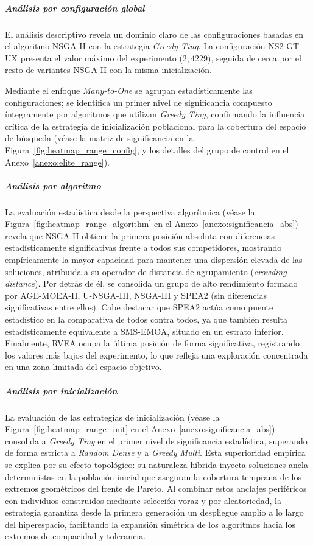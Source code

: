 \subparagraph{Análisis por configuración global}

El análisis descriptivo revela un dominio claro de las configuraciones basadas en el algoritmo NSGA-II con la estrategia \textit{Greedy Ting}. La configuración NS2-GT-UX presenta el valor máximo del experimento ($2{,}4229$), seguida de cerca por el resto de variantes NSGA-II con la misma inicialización. 

Mediante el enfoque \textit{Many-to-One} se agrupan estadísticamente las configuraciones; se identifica un primer nivel de significancia compuesto íntegramente por algoritmos que utilizan \textit{Greedy Ting}, confirmando la influencia crítica de la estrategia de inicialización poblacional para la cobertura del espacio de búsqueda (véase la matriz de significancia en la Figura~\ref{fig:heatmap_range_config}, y los detalles del grupo de control en el Anexo~\ref{anexo:elite_range}).

\subparagraph{Análisis por algoritmo}

La evaluación estadística desde la perspectiva algorítmica (véase la Figura~\ref{fig:heatmap_range_algorithm} en el Anexo~\ref{anexo:significancia_abs}) revela que NSGA-II obtiene la primera posición absoluta con diferencias estadísticamente significativas frente a todos sus competidores, mostrando empíricamente la mayor capacidad para mantener una dispersión elevada de las soluciones, atribuida a su operador de distancia de agrupamiento (\textit{crowding distance}). Por detrás de él, se consolida un grupo de alto rendimiento formado por AGE-MOEA-II, U-NSGA-III, NSGA-III y SPEA2 (sin diferencias significativas entre ellos). Cabe destacar que SPEA2 actúa como puente estadístico en la comparativa de todos contra todos, ya que también resulta estadísticamente equivalente a SMS-EMOA, situado en un estrato inferior. Finalmente, RVEA ocupa la última posición de forma significativa, registrando los valores más bajos del experimento, lo que refleja una exploración concentrada en una zona limitada del espacio objetivo.

\subparagraph{Análisis por inicialización}

La evaluación de las estrategias de inicialización (véase la Figura~\ref{fig:heatmap_range_init} en el Anexo~\ref{anexo:significancia_abs}) consolida a \textit{Greedy Ting} en el primer nivel de significancia estadística, superando de forma estricta a \textit{Random Dense} y a \textit{Greedy Multi}. Esta superioridad empírica se explica por su efecto topológico: su naturaleza híbrida inyecta soluciones ancla deterministas en la población inicial que aseguran la cobertura temprana de los extremos geométricos del frente de Pareto. Al combinar estos anclajes periféricos con individuos construidos mediante selección voraz y por aleatoriedad, la estrategia garantiza desde la primera generación un despliegue amplio a lo largo del hiperespacio, facilitando la expansión simétrica de los algoritmos hacia los extremos de compacidad y tolerancia.

